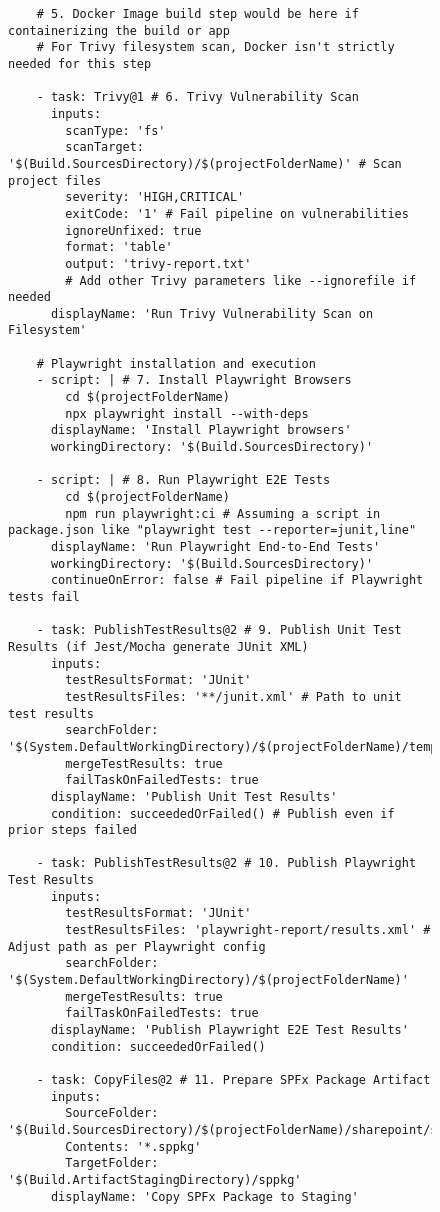 \begin{figure}[htbp]
{\begin{verbatim}
    # 5. Docker Image build step would be here if containerizing the build or app
    # For Trivy filesystem scan, Docker isn't strictly needed for this step

    - task: Trivy@1 # 6. Trivy Vulnerability Scan
      inputs:
        scanType: 'fs'
        scanTarget: '$(Build.SourcesDirectory)/$(projectFolderName)' # Scan project files
        severity: 'HIGH,CRITICAL'
        exitCode: '1' # Fail pipeline on vulnerabilities
        ignoreUnfixed: true
        format: 'table'
        output: 'trivy-report.txt'
        # Add other Trivy parameters like --ignorefile if needed
      displayName: 'Run Trivy Vulnerability Scan on Filesystem'

    # Playwright installation and execution
    - script: | # 7. Install Playwright Browsers
        cd $(projectFolderName)
        npx playwright install --with-deps
      displayName: 'Install Playwright browsers'
      workingDirectory: '$(Build.SourcesDirectory)'

    - script: | # 8. Run Playwright E2E Tests
        cd $(projectFolderName)
        npm run playwright:ci # Assuming a script in package.json like "playwright test --reporter=junit,line"
      displayName: 'Run Playwright End-to-End Tests'
      workingDirectory: '$(Build.SourcesDirectory)'
      continueOnError: false # Fail pipeline if Playwright tests fail

    - task: PublishTestResults@2 # 9. Publish Unit Test Results (if Jest/Mocha generate JUnit XML)
      inputs:
        testResultsFormat: 'JUnit'
        testResultsFiles: '**/junit.xml' # Path to unit test results
        searchFolder: '$(System.DefaultWorkingDirectory)/$(projectFolderName)/temp/tests'
        mergeTestResults: true
        failTaskOnFailedTests: true
      displayName: 'Publish Unit Test Results'
      condition: succeededOrFailed() # Publish even if prior steps failed

    - task: PublishTestResults@2 # 10. Publish Playwright Test Results
      inputs:
        testResultsFormat: 'JUnit'
        testResultsFiles: 'playwright-report/results.xml' # Adjust path as per Playwright config
        searchFolder: '$(System.DefaultWorkingDirectory)/$(projectFolderName)'
        mergeTestResults: true
        failTaskOnFailedTests: true
      displayName: 'Publish Playwright E2E Test Results'
      condition: succeededOrFailed()

    - task: CopyFiles@2 # 11. Prepare SPFx Package Artifact
      inputs:
        SourceFolder: '$(Build.SourcesDirectory)/$(projectFolderName)/sharepoint/solution'
        Contents: '*.sppkg'
        TargetFolder: '$(Build.ArtifactStagingDirectory)/sppkg'
      displayName: 'Copy SPFx Package to Staging'


\end{verbatim}}
\end{figure}
